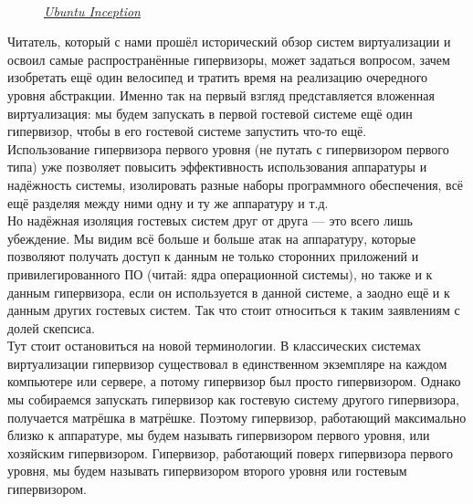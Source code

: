 \documentclass[14pt, a4paper]{article}
\begin{document}
\begin{figure}[h]
    \centering
    \\
    \small\textit{\href{https://tchubirabiron.wordpress.com/}{Ubuntu Inception}}
    \label{framework} 
\end{figure}

Читатель, который с нами прошёл исторический обзор систем виртуализации и освоил самые
распространённые гипервизоры, может задаться вопросом, зачем изобретать ещё один велосипед и
тратить время на реализацию очередного уровня абстракции. Именно так на первый взгляд
представляется вложенная виртуализация: мы будем запускать в первой гостевой системе ещё один
гипервизор, чтобы в его гостевой системе запустить что-то ещё.\\

Использование гипервизора первого уровня (не путать с гипервизором первого типа) уже позволяет
повысить эффективность использования аппаратуры и надёжность системы, изолировать разные
наборы программного обеспечения, всё ещё разделяя между ними одну и ту же аппаратуру и т.д.\\

Но надёжная изоляция гостевых систем друг от друга — это всего лишь убеждение. Мы видим всё
больше и больше атак на аппаратуру, которые позволяют получать доступ к данным не только
сторонних приложений и привилегированного ПО (читай: ядра операционной системы), но также и к
данным гипервизора, если он используется в данной системе, а заодно ещё и к данным других
гостевых систем. Так что стоит относиться к таким заявлениям с долей скепсиса.\\

Тут стоит остановиться на новой терминологии. В классических системах виртуализации гипервизор
существовал в единственном экземпляре на каждом компьютере или сервере, а потому гипервизор
был просто гипервизором. Однако мы собираемся запускать гипервизор как гостевую систему другого
гипервизора, получается матрёшка в матрёшке. Поэтому гипервизор, работающий максимально
близко к аппаратуре, мы будем называть гипервизором первого уровня, или хозяйским гипервизором.
Гипервизор, работающий поверх гипервизора первого уровня, мы будем называть гипервизором
второго уровня или гостевым гипервизором.\\

\begin{figure}[h]
    \centering
    \\
    \label{framework} 
\end{figure}
\end{document}
